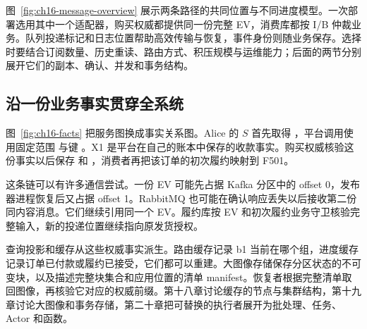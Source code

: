 图~\ref{fig:ch16-message-overview} 展示两条路径的共同位置与不同进度模型。一次部署选用其中一个适配器，购买权威都提供同一份完整 EV，消费库都按 I/B 仲裁业务。队列投递标记和日志位置帮助高效传输与恢复，事件身份则随业务保存。选择时要结合订阅数量、历史重读、路由方式、积压规模与运维能力；后面的两节分别展开它们的副本、确认、并发和事务结构。


\subsection{沿一份业务事实贯穿全系统}

图~\ref{fig:ch16-facts} 把服务图换成事实关系图。Alice 的 $S$ 首先取得 ，平台调用使用固定范围  与键 。X1 是平台在自己的账本中保存的收款事实。购买权威核验这份事实以后保存  和 ，消费者再把该订单的初次履约映射到 F501。


这条链可以有许多通信尝试。一份 EV 可能先占据 Kafka 分区中的 offset 0，发布器进程恢复后又占据 offset 1。RabbitMQ 也可能在确认响应丢失以后接收第二份同内容消息。它们继续引用同一个 EV。履约库按 EV 和初次履约业务守卫核验完整输入，新的投递位置继续指向原发货授权。

查询投影和缓存从这些权威事实派生。路由缓存记录 b1 当前在哪个组，进度缓存记录订单已付款或履约已接受，它们都可以重建。大图像存储保存分区状态的不可变块，以及描述完整块集合和应用位置的清单 manifest。恢复者根据完整清单取回图像，再核验它对应的权威前缀。第十八章讨论缓存的节点与集群结构，第十九章讨论大图像和事务存储，第二十章把可替换的执行者展开为批处理、任务、Actor 和函数。
